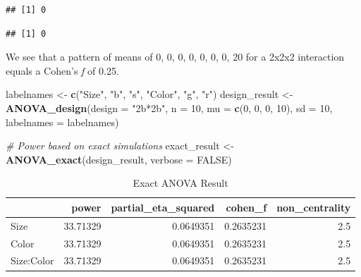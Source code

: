 \documentclass[]{book}
\newenvironment{Shaded}{\begin{snugshade}}{\end{snugshade}}
\newcommand{\CommentTok}[1]{\textcolor[rgb]{0.56,0.35,0.01}{\textit{#1}}}
\newcommand{\DataTypeTok}[1]{\textcolor[rgb]{0.13,0.29,0.53}{#1}}
\newcommand{\DecValTok}[1]{\textcolor[rgb]{0.00,0.00,0.81}{#1}}
\newcommand{\KeywordTok}[1]{\textcolor[rgb]{0.13,0.29,0.53}{\textbf{#1}}}
\newcommand{\NormalTok}[1]{#1}
\newcommand{\OperatorTok}[1]{\textcolor[rgb]{0.81,0.36,0.00}{\textbf{#1}}}
\newcommand{\OtherTok}[1]{\textcolor[rgb]{0.56,0.35,0.01}{#1}}
\newcommand{\StringTok}[1]{\textcolor[rgb]{0.31,0.60,0.02}{#1}}
\begin{document}
\begin{Shaded}
\end{Shaded}

\begin{verbatim}
## [1] 0
\end{verbatim}

\begin{Shaded}
\end{Shaded}

\begin{verbatim}
## [1] 0
\end{verbatim}

We see that a pattern of means of 0, 0, 0, 0, 0, 0, 0, 20 for a 2x2x2 interaction equals a Cohen's \emph{f} of 0.25.

\begin{Shaded}
\begin{Highlighting}[]
\NormalTok{labelnames <-}\StringTok{ }\KeywordTok{c}\NormalTok{(}\StringTok{"Size"}\NormalTok{, }\StringTok{"b"}\NormalTok{, }\StringTok{"s"}\NormalTok{, }\StringTok{"Color"}\NormalTok{, }\StringTok{"g"}\NormalTok{, }\StringTok{"r"}\NormalTok{)}
\NormalTok{design_result <-}\StringTok{ }\KeywordTok{ANOVA_design}\NormalTok{(}\DataTypeTok{design =} \StringTok{"2b*2b"}\NormalTok{, }
                              \DataTypeTok{n =} \DecValTok{10}\NormalTok{, }
                              \DataTypeTok{mu =} \KeywordTok{c}\NormalTok{(}\DecValTok{0}\NormalTok{, }\DecValTok{0}\NormalTok{, }\DecValTok{0}\NormalTok{, }\DecValTok{10}\NormalTok{), }
                              \DataTypeTok{sd =} \DecValTok{10}\NormalTok{, }
                              \DataTypeTok{labelnames =}\NormalTok{ labelnames) }

\CommentTok{# Power based on exact simulations}
\NormalTok{exact_result <-}\StringTok{ }\KeywordTok{ANOVA_exact}\NormalTok{(design_result,}
                            \DataTypeTok{verbose =} \OtherTok{FALSE}\NormalTok{)}
\end{Highlighting}
\end{Shaded}

\begin{table}[!h]

\caption{\label{tab:unnamed-chunk-235}Exact ANOVA Result}
\centering
\begin{tabular}{l|r|r|r|r}
\hline
  & power & partial\_eta\_squared & cohen\_f & non\_centrality\\
\hline
Size & 33.71329 & 0.0649351 & 0.2635231 & 2.5\\
\hline
Color & 33.71329 & 0.0649351 & 0.2635231 & 2.5\\
\hline
Size:Color & 33.71329 & 0.0649351 & 0.2635231 & 2.5\\
\hline
\end{tabular}
\end{table}
\end{document}
